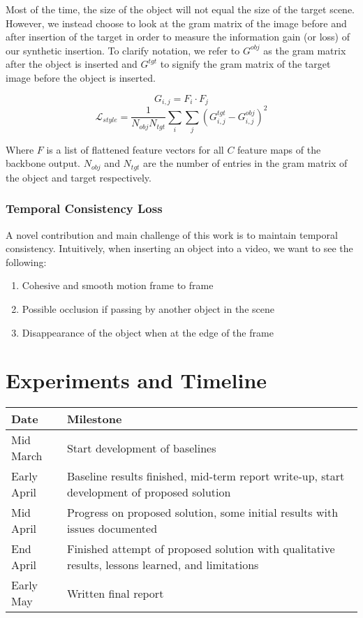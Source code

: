 \documentclass{article}
\begin{document}
Most of the time, the size of the object will not equal the size of the target scene. However, we instead choose to look at the gram matrix of the image before and after insertion of the target in order to measure the information gain (or loss) of our synthetic insertion. To clarify notation, we refer to $G^{obj}$ as the gram matrix after the object is inserted and $G^{tgt}$ to signify the gram matrix of the target image before the object is inserted.

$$G_{i, j} = F_i \cdot F_j$$
$$\mathcal{L}_{style} = \frac{1}{N_{obj} N_{tgt}} \sum_i \sum_j (G_{i, j}^{tgt} - G_{i, j}^{obj})^2$$

Where $F$ is a list of flattened feature vectors for all $C$ feature maps of the backbone output. $N_{obj}$ and $N_{tgt}$ are the number of entries in the gram matrix of the object and target respectively.

\subsubsection{Temporal Consistency Loss}
A novel contribution and main challenge of this work is to maintain temporal consistency. Intuitively, when inserting an object into a video, we want to see the following:

\begin{enumerate}
    \item Cohesive and smooth motion frame to frame
    \item Possible occlusion if passing by another object in the scene
    \item Disappearance of the object when at the edge of the frame
\end{enumerate}

\section{Experiments and Timeline}
\begin{center}
\begin{tabular}{|| p{2cm} | p{12cm} ||}
    \hline
    \textbf{Date} & \textbf{Milestone} \\
    \hline
    Mid March & Start development of baselines \\
    \hline
    Early April & Baseline results finished, mid-term report write-up, start development of proposed solution \\
    \hline
    Mid April & Progress on proposed solution, some initial results with issues documented \\
    \hline
    End April & Finished attempt of proposed solution with qualitative results, lessons learned, and limitations\\
    \hline
    Early May & Written final report \\
    \hline
\end{tabular}
\end{center}
\end{document}
